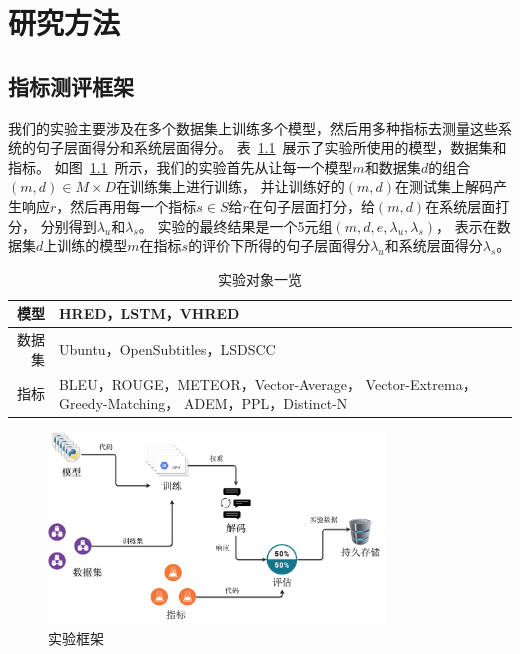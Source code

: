 
\chapter{研究方法}\label{ch:method}

\section{指标测评框架}\label{sec:eval_framework}
我们的实验主要涉及在多个数据集上训练多个模型，然后用多种指标去测量这些系统的句子层面得分和系统层面得分。
表~\ref{tab:experiment_triples}~展示了实验所使用的模型，数据集和指标。
如图~\ref{fig:framework}~所示，我们的实验首先从让每一个模型$m$和数据集$d$的组合$(m, d) \in M \times D$在训练集上进行训练，
并让训练好的$(m, d)$在测试集上解码产生响应$r$，然后再用每一个指标$s \in S$给$r$在句子层面打分，给$(m, d)$在系统层面打分，
分别得到$\lambda_{u}$和$\lambda_{s}$。
实验的最终结果是一个5元组$(m, d, e, \lambda_{u}, \lambda_{s})$，
表示在数据集$d$上训练的模型$m$在指标$s$的评价下所得的句子层面得分$\lambda_u$和系统层面得分$\lambda_s$。


\begin{table}[H]
    \centering
    \caption{实验对象一览}
    \label{tab:experiment_triples}
    \begin{tabular}{|r|m{}|}
        \hline
        模型 & HRED，LSTM，VHRED \\
        \hline
        数据集 & Ubuntu，OpenSubtitles，LSDSCC \\
        \hline
        指标 & BLEU，ROUGE，METEOR，Vector-Average，
        Vector-Extrema，Greedy-Matching，
        ADEM，PPL，Distinct-N \\
        \hline
    \end{tabular}
\end{table}

\begin{figure}[H]
    \centering
    \includegraphics[width=0.8\textwidth]{figure/drawio/eval_v4.pdf}
    \caption{实验框架}
    \label{fig:framework}
\end{figure}

